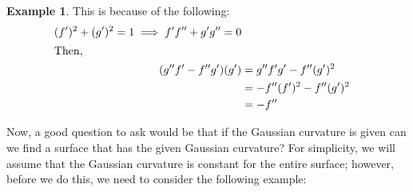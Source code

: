 \documentclass{article}
\theoremstyle{plain}
\theoremstyle{definition}
\newtheorem{example}{Example}
\theoremstyle{remark}
\begin{document}
\begin{example}
    This is because of the following:
    \begin{align*}
        (f^{\prime})^2 + (g^{\prime})^2  = 1  \implies f^{\prime}f^{\prime \prime} + g^{\prime}g^{\prime \prime}  = 0                                             \\
        \shortintertext{Then, }
        (g^{\prime \prime}f^{\prime} -  f^{\prime \prime} g^{\prime})(g^{\prime} ) & = g^{\prime \prime}f^{\prime}g^{\prime}  -  f^{\prime \prime} (g^{\prime})^2 \\
        & =  -f^{\prime \prime}(f^{\prime})^2  -  f^{\prime \prime} (g^{\prime})^2     \\
        & = -f^{\prime \prime}
    \end{align*}
\end{example}

Now, a good question to ask would be that if the Gaussian curvature is given can we find a surface that has the given Gaussian curvature? For simplicity, we will assume that the Gaussian curvature is constant for the entire surface; however, before we do this, we need to consider the following example:
\end{document}
